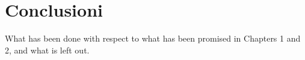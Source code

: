 
\chapter{Conclusioni}

What has been done with respect to what has been promised in Chapters 1 and 2, and what is left out.
